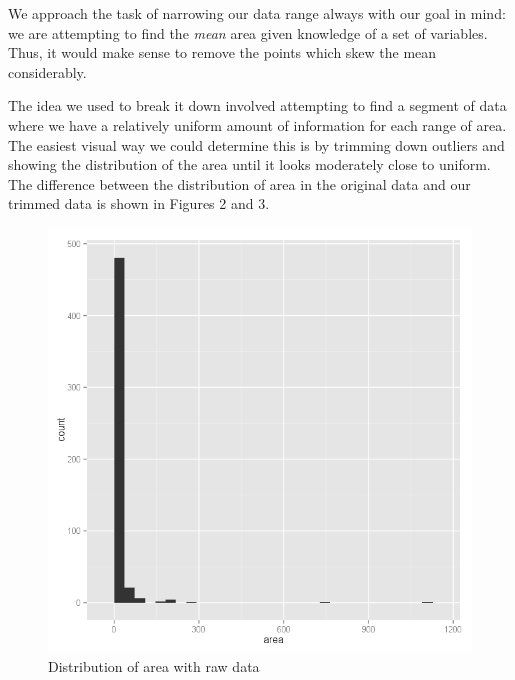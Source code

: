 \documentclass{article}
\begin{document}
We approach the task of narrowing our data range always with our goal in mind:
we are attempting to find the \emph{mean} area given knowledge of a set of
variables. Thus, it would make sense to remove the points which skew the mean
considerably.

The idea we used to break it down involved attempting to find a segment of data
where we have a relatively uniform amount of information for each range of
area. The easiest visual way we could determine this is by trimming down
outliers and showing the distribution of the area until it looks moderately
close to uniform. The difference between the distribution of area in the
original data and our trimmed data is shown in Figures 2 and 3.

\begin{figure}
  \begin{minipage}[b]{0.45\linewidth}
  \centering
  \includegraphics[width=\textwidth]{figures/badhist.png}
  \caption{Distribution of area with raw data}
\end{minipage}
\hspace{0.5cm}
  \begin{minipage}[b]{0.45\linewidth}
  \centering

\end{minipage}
\end{figure}
\end{document}
